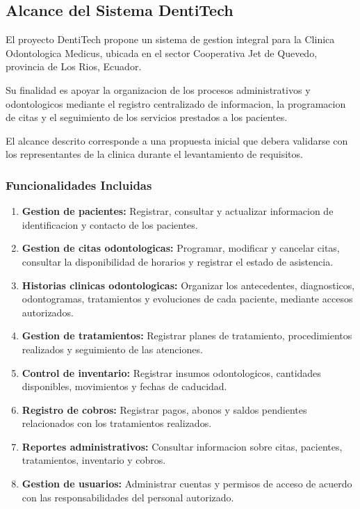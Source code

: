 
\subsection{Alcance del Sistema DentiTech}

El proyecto DentiTech propone un sistema de gestion
integral para la Clinica Odontologica Medicus,
ubicada en el sector Cooperativa Jet de Quevedo,
provincia de Los Rios, Ecuador.

Su finalidad es apoyar la organizacion de los
procesos administrativos y odontologicos mediante
el registro centralizado de informacion, la
programacion de citas y el seguimiento de los
servicios prestados a los pacientes.

El alcance descrito corresponde a una propuesta
inicial que debera validarse con los representantes
de la clinica durante el levantamiento de requisitos.

\subsubsection{Funcionalidades Incluidas}

\begin{enumerate}
    \item \textbf{Gestion de pacientes:}
    Registrar, consultar y actualizar informacion
    de identificacion y contacto de los pacientes.

    \item \textbf{Gestion de citas odontologicas:}
    Programar, modificar y cancelar citas, consultar
    la disponibilidad de horarios y registrar
    el estado de asistencia.

    \item \textbf{Historias clinicas odontologicas:}
    Organizar los antecedentes, diagnosticos,
    odontogramas, tratamientos y evoluciones
    de cada paciente, mediante accesos autorizados.

    \item \textbf{Gestion de tratamientos:}
    Registrar planes de tratamiento, procedimientos
    realizados y seguimiento de las atenciones.

    \item \textbf{Control de inventario:}
    Registrar insumos odontologicos, cantidades
    disponibles, movimientos y fechas de caducidad.

    \item \textbf{Registro de cobros:}
    Registrar pagos, abonos y saldos pendientes
    relacionados con los tratamientos realizados.

    \item \textbf{Reportes administrativos:}
    Consultar informacion sobre citas, pacientes,
    tratamientos, inventario y cobros.

    \item \textbf{Gestion de usuarios:}
    Administrar cuentas y permisos de acceso
    de acuerdo con las responsabilidades
    del personal autorizado.
\end{enumerate}

